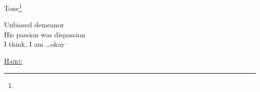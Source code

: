 \documentclass[12pt]{article}
\begin{document}
\begin{center}
  \LARGE{Tone\footnote{}}
\end{center}

\begin{center}
  \Large{Unbiased demeanor}  \\
  \Large{His passion was dispassion}  \\
  \Large{I think, I am \dots okay}  \\
\end{center}

\begin{center}
  \large{\underline{\textsc{Haiku}}}
\end{center}
\end{document}
